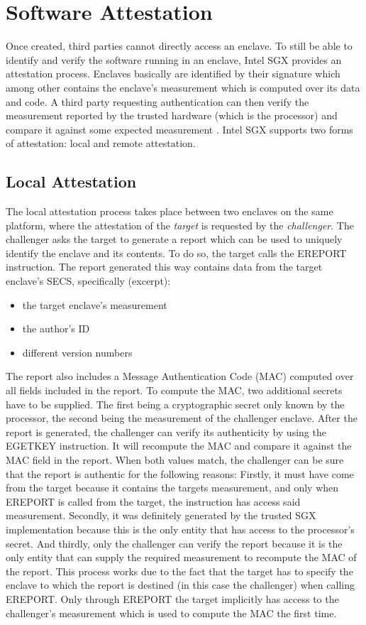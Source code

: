 \section{Software Attestation}
Once created, third parties cannot directly access an enclave. To still be able to identify and verify the software running in an enclave, Intel SGX provides an attestation process.
Enclaves basically are identified by their signature which among other contains the enclave's measurement which is computed over its data and code. A third party requesting
authentication can then verify the measurement reported by the trusted hardware (which is the processor) and compare it against some expected measurement \cite{Costan2016IntelSE}.
Intel SGX supports two forms of attestation: local and remote attestation.

\subsection{Local Attestation}
The local attestation process takes place between two enclaves on the same platform, where the attestation of the \textit{target} is requested by the \textit{challenger}. The 
challenger asks the target to generate a report which can be used to uniquely identify the enclave and its contents. To do so, the target calls the EREPORT instruction. The report 
generated this way contains data from the target enclave's SECS, specifically (excerpt):
\begin{itemize}
    \item the target enclave's measurement
    \item the author's ID
    \item different version numbers
\end{itemize}
The report also includes a Message Authentication Code (MAC) computed over all fields included in the report. To compute the MAC, two additional secrets have to be supplied.
The first being a cryptographic secret only known by the processor, the second being the measurement of the challenger enclave. After the report is generated, the challenger can
verify its authenticity by using the EGETKEY instruction. It will recompute the MAC and compare it against the MAC field in the report. When both values match, the challenger can
be sure that the report is authentic for the following reasons: Firstly, it must have come from the target because it contains the targets measurement, and only when EREPORT is 
called from the target, the instruction has access said measurement. Secondly, it was definitely generated by the trusted SGX implementation because this is the only entity that 
has access to the processor's secret. And thirdly, only the challenger can verify the report because it is the only entity that can supply the required measurement to recompute the 
MAC of the report. This process works due to the fact that the target has to specify the enclave to which the report is destined (in this case the challenger) when calling EREPORT.
Only through EREPORT the target implicitly has access to the challenger's measurement which is used to compute the MAC the first time.
